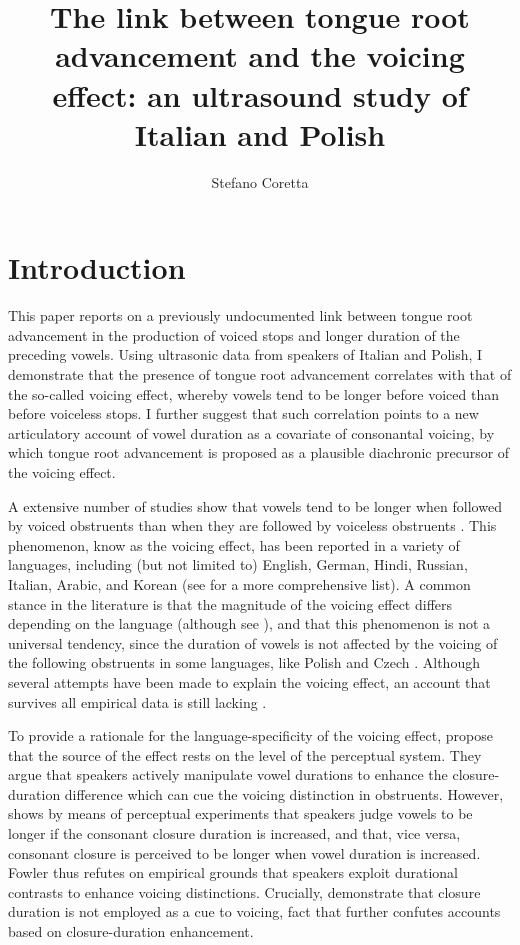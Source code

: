 \documentclass[authoryear, twocolumn]{elsarticle}
\author[mcr]{Stefano Coretta\corref{cor1}}
\title{The link between tongue root advancement and the voicing effect: an
ultrasound study of Italian and Polish}
\date{}
\begin{document}
\maketitle

\section{Introduction}\label{introduction}

\label{s:intro}

This paper reports on a previously undocumented link between tongue root
advancement in the production of voiced stops and longer duration of the
preceding vowels. Using ultrasonic data from speakers of Italian and
Polish, I demonstrate that the presence of tongue root advancement
correlates with that of the so-called voicing effect, whereby vowels
tend to be longer before voiced than before voiceless stops. I further
suggest that such correlation points to a new articulatory account of
vowel duration as a covariate of consonantal voicing, by which tongue
root advancement is proposed as a plausible diachronic precursor of the
voicing effect.

A extensive number of studies show that vowels tend to be longer when
followed by voiced obstruents than when they are followed by voiceless
obstruents
\citep{house1953, chen1970, klatt1973, lisker1974, farnetani1986, fowler1992, hussein1994, esposito2002, lampp2004, durvasula2012}.
This phenomenon, know as the voicing effect, has been reported in a
variety of languages, including (but not limited to) English, German,
Hindi, Russian, Italian, Arabic, and Korean (see \citealt{maddieson1976}
for a more comprehensive list). A common stance in the literature is
that the magnitude of the voicing effect differs depending on the
language (although see \citealt{laeufer1992}), and that this phenomenon
is not a universal tendency, since the duration of vowels is not
affected by the voicing of the following obstruents in some languages,
like Polish and Czech \citep{keating1984}. Although several attempts
have been made to explain the voicing effect, an account that survives
all empirical data is still lacking \citep{durvasula2012}.

To provide a rationale for the language-specificity of the voicing
effect, \citet{kluender1988} propose that the source of the effect rests
on the level of the perceptual system. They argue that speakers actively
manipulate vowel durations to enhance the closure-duration difference
which can cue the voicing distinction in obstruents. However,
\citet{fowler1992} shows by means of perceptual experiments that
speakers judge vowels to be longer if the consonant closure duration is
increased, and that, vice versa, consonant closure is perceived to be
longer when vowel duration is increased. Fowler thus refutes on
empirical grounds that speakers exploit durational contrasts to enhance
voicing distinctions. Crucially, \citet{davis1989} demonstrate that
closure duration is not employed as a cue to voicing, fact that further
confutes accounts based on closure-duration enhancement.
\end{document}
